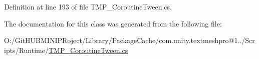 Definition at line 193 of file T\+M\+P\+\_\+\+Coroutine\+Tween.\+cs.



The documentation for this class was generated from the following file\+:\begin{DoxyCompactItemize}
\item 
O\+:/\+Git\+H\+U\+B\+M\+I\+N\+I\+P\+Roject/\+Library/\+Package\+Cache/com.\+unity.\+textmeshpro@1../\+Scripts/\+Runtime/\mbox{\hyperlink{_t_m_p___coroutine_tween_8cs}{T\+M\+P\+\_\+\+Coroutine\+Tween.\+cs}}\end{DoxyCompactItemize}

